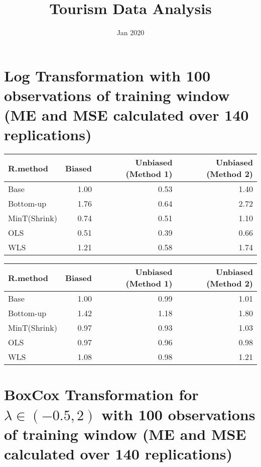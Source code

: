 \documentclass[
]{article}
\title{Tourism Data Analysis}
\author{}
\date{\vspace{-2.5em}Jan 2020}
\begin{document}
\maketitle

\hypertarget{log-transformation-with-100-observations-of-training-window-me-and-mse-calculated-over-140-replications}{%
\section{Log Transformation with 100 observations of training window (ME
and MSE calculated over 140
replications)}\label{log-transformation-with-100-observations-of-training-window-me-and-mse-calculated-over-140-replications}}

\begin{tabular}{l|r|r|r}
\hline
R.method & Biased & Unbiased (Method 1) & Unbiased (Method 2)\\\hline
Base & 1.00 & 0.53 & 1.40\\ \hline
Bottom-up & 1.76 & 0.64 & 2.72\\ \hline
MinT(Shrink) & 0.74 & 0.51 & 1.10\\\hline
OLS & 0.51 & 0.39 & 0.66\\\hline
WLS & 1.21 & 0.58 & 1.74\\
\hline
\end{tabular}

\begin{tabular}{l|r|r|r}
\hline
R.method & Biased & Unbiased (Method 1) & Unbiased (Method 2)\\\hline
Base & 1.00 & 0.99 & 1.01\\\hline
Bottom-up & 1.42 & 1.18 & 1.80\\\hline
MinT(Shrink) & 0.97 & 0.93 & 1.03\\\hline
OLS & 0.97 & 0.96 & 0.98\\\hline
WLS & 1.08 & 0.98 & 1.21\\\hline
\end{tabular}

\hypertarget{boxcox-transformation-for-lambda-in--0.52-with-100-observations-of-training-window-me-and-mse-calculated-over-140-replications}{%
\section{\texorpdfstring{BoxCox Transformation for
\(\lambda \in (-0.5,2)\) with 100 observations of training window (ME
and MSE calculated over 140
replications)}{BoxCox Transformation for \textbackslash lambda \textbackslash in (-0.5,2) with 100 observations of training window (ME and MSE calculated over 140 replications)}}\label{boxcox-transformation-for-lambda-in--0.52-with-100-observations-of-training-window-me-and-mse-calculated-over-140-replications}}
\end{document}
